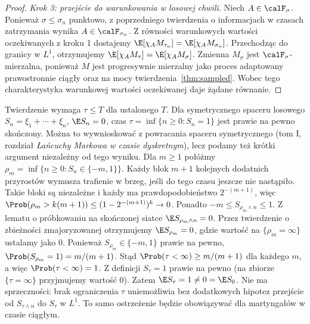 \begin{proof}
\emph{Krok 3: przejście do warunkowania w losowej chwili.}
Niech $A\in\calF_\sigma$. Ponieważ
$\sigma\le\sigma_n$ punktowo, z poprzedniego
twierdzenia o informacjach w czasach zatrzymania
wynika $A\in\calF_{\sigma_n}$. Z równości
warunkowych wartości oczekiwanych z kroku 1 dostajemy
$\E[\chi_A M_{\tau_n}]=\E[\chi_A M_{\sigma_n}]$.
Przechodząc do granicy w $L^1$, otrzymujemy
$\E[\chi_A M_\tau]=\E[\chi_A M_\sigma]$.
Zmienna $M_\sigma$ jest $\calF_\sigma$-mierzalna,
ponieważ $M$ jest progresywnie mierzalny jako
proces adaptowany prawostronnie ciągły oraz na mocy
twierdzenia~\ref{thm:sampled}.
Wobec tego charakterystyka warunkowej wartości
oczekiwanej daje żądane równanie.
\end{proof}

\begin{uwaga}
Twierdzenie wymaga $\tau\le T$ dla ustalonego $T$.
Dla symetrycznego spaceru losowego
$S_n=\xi_1+\cdots+\xi_n$, $\E S_n=0$,
czas $\tau=\inf\{n\ge0:S_n=1\}$ jest prawie
na pewno skończony. Można to wywnioskować z powracania
spaceru symetrycznego (tom I, rozdział \emph{Łańcuchy
Markowa w czasie dyskretnym}), lecz podamy też krótki
argument niezależny od tego wyniku. Dla $m\ge1$ połóżmy
$\rho_m=\inf\{n\ge0:S_n\in\{-m,1\}\}$.
Każdy blok $m+1$ kolejnych dodatnich przyrostów wymusza
trafienie w brzeg, jeśli do tego czasu jeszcze nie
nastąpiło. Takie bloki są niezależne i każdy ma
prawdopodobieństwo $2^{-(m+1)}$, więc
$\Prob(\rho_m>k(m+1))\le(1-2^{-(m+1)})^k\to0$.
Ponadto $-m\le S_{\rho_m\wedge n}\le1$.
Z lematu o próbkowaniu na skończonej siatce
$\E S_{\rho_m\wedge n}=0$. Przez twierdzenie
o zbieżności zmajoryzowanej otrzymujemy
$\E S_{\rho_m}=0$, gdzie wartość na
$\{\rho_m=\infty\}$ ustalamy jako $0$.
Ponieważ $S_{\rho_m}\in\{-m,1\}$ prawie na pewno,
$\Prob(S_{\rho_m}=1)=m/(m+1)$.
Stąd $\Prob(\tau<\infty)\ge m/(m+1)$ dla każdego $m$,
a więc $\Prob(\tau<\infty)=1$.
Z definicji $S_\tau=1$ prawie na pewno (na zbiorze
$\{\tau=\infty\}$ przyjmujemy wartość $0$).
Zatem $\E S_\tau=1\ne0=\E S_0$.
Nie ma sprzeczności: brak ograniczenia $\tau$
uniemożliwia bez dodatkowych hipotez przejście
od $S_{\tau\wedge n}$ do $S_\tau$ w $L^1$.
To samo ostrzeżenie będzie obowiązywać dla
martyngałów w czasie ciągłym.
\end{uwaga}


